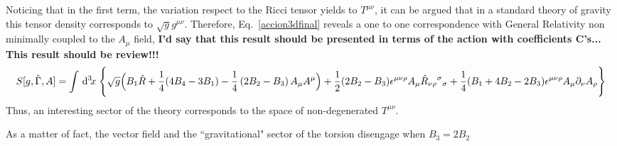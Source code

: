 \documentclass[twocolumn,
  showpacs,showkeys,prd,superscriptaddress]{revtex4-1}
\def\l{\left}
\def\r{\right}
\newcommand{\hl}[1]{{\color{red} \textbf{#1}}}
\begin{document}
Noticing that in  the first term, the variation respect to the Ricci tensor yields to $T^{\mu\nu}$, it can be argued that in a standard theory of gravity this tensor density corresponds to $\sqrt{g}g^{\mu\nu}$.
Therefore, Eq.~\eqref{accion3dfinal} reveals a one to one correspondence with General Relativity non minimally coupled to the $A_\mu$ field, \hl{I'd say that this result should be presented in terms of the action with coefficients C's... This result should be review!!!}
\begin{dmath}
  \label{accion3dGR}
    S[g,\hat\Gamma,A] =
    \int\dn{3}{x} \Bigg\{\sqrt{g}\Big(B_1\hat R +\frac{1}{4}(4B_4-3B_1) -\frac{1}{4}\l( 2B_2-B_3\r) A_\mu A^\mu\Big) + \frac{1}{2}(2B_2-B_3)\epsilon^{\mu\nu\rho}A_\mu\hat R_{\nu\rho}{}^{\sigma}{}_\sigma+\frac{1}{4}(B_1+4B_2-2B_3)\epsilon^{\mu\nu\rho}A_\mu\partial_\nu A_\rho\Bigg\}
\end{dmath}
Thus, an interesting sector of the theory corresponds to the space of non-degenerated $T^{\mu\nu}$. 

As a matter of fact, the vector field and the ``gravitational" sector of the torsion disengage when $B_3=2B_2$

\end{document}
